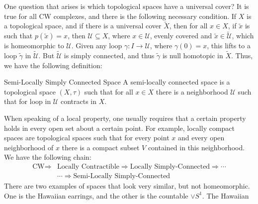 \documentclass{book}                                                           %
\begin{document}
            One question that arises is which topological spaces have
            a universal cover? It is true for all CW complexes, and
            there is the following necessary condition.
            If $X$ is a topological space, and if there is a
            universal cover $\tilde{X}$, then for all
            $x\in{X}$, if $\tilde{x}$ is such that
            $p(\tilde{x})=x$, then $\mathcal{U}\subseteq{X}$, where
            $x\in\mathcal{U}$, evenly covered and
            $\tilde{x}\in\tilde{\mathcal{U}}$, which is homeomorphic
            to $\mathcal{U}$. Given any loop
            $\gamma:I\rightarrow\mathcal{U}$, where $\gamma(0)=x$,
            this lifts to a loop $\tilde{\gamma}$ in
            $\tilde{\mathcal{U}}$. But $\tilde{\mathcal{U}}$ is
            simply connected, and thus $\tilde{\gamma}$ is null
            homotopic in $\tilde{X}$. Thus, we have the following
            definition:
            \begin{ldefinition}{Semi-Locally Simply Connected Space}
                A semi-locally connected space is a topological
                space $(X,\tau)$ such that for all $x\in{X}$ there is
                a neighborhood $\mathcal{U}$ such that for loop in
                $\mathcal{U}$ contracts in $X$.
            \end{ldefinition}
            When speaking of a local property, one usually requires that
            a certain property holds in every open set about a certain
            point. For example, locally compact spaces are topological
            spaces such that for every point $x$ and every open
            neighborhood of $x$ there is a compact subset $V$ contained
            in this neighborhood. We have the following chain:
            \begin{equation}
                \begin{split}
                    \textrm{CW}\Longrightarrow
                    &\textrm{Locally Contractible}\Longrightarrow
                    \textrm{Locally Simply-Connected}
                    \Longrightarrow\cdots\\
                    &\cdots\Longrightarrow
                    \textrm{Semi-Locally Simply-Connected}
                \end{split}
            \end{equation}
            There are two examples of spaces that look very similar,
            but not homeomorphic. One is the Hawaiian earrings, and
            the other is the countable $\lor{S}^{1}$. The Hawaiian
\end{document}
